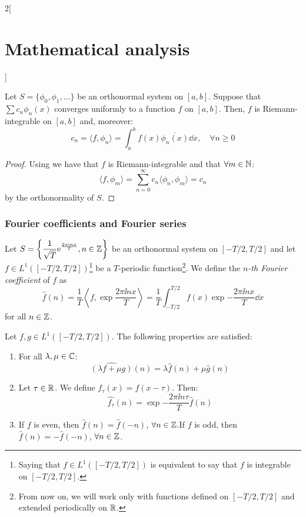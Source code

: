 \documentclass[../../../main_math.tex]{subfiles}
\begin{document}
\begin{multicols}{2}[\section{Mathematical analysis}]
\begin{definition}
  \end{definition}
  \begin{theorem}
    Let $S=\{\phi_0,\phi_1,\ldots\}$ be an orthonormal system on $[a,b]$. Suppose that $\sum c_n\phi_n(x)$ converges uniformly to a function $f$ on $[a,b]$. Then, $f$ is Riemann-integrable on $[a,b]$ and, moreover: $$c_n=\langle f,\phi_n\rangle=\int_a^bf(x)\overline{\phi_n(x)}\dd{x},\quad\forall n\geq 0$$
  \end{theorem}
  \begin{proof}
    Using  we have that $f$ is Riemann-integrable and that $\forall m\in\mathbb{N}$:
    $$\langle f,\phi_m\rangle=\sum_{n=0}^\infty c_n\langle \phi_n,\phi_m\rangle = c_n$$
    by the orthonormality of $S$.
  \end{proof}
  \subsubsection{Fourier coefficients and Fourier series}
  \begin{definition}
    Let $\displaystyle S=\left\{\frac{1}{\sqrt{T}}\mathrm{e}^{\frac{2\pi\mathrm{i} nx}{T}},n\in\mathbb{Z} \right\}$ be an orthonormal system on $[-T/2,T/2]$ and let $f\in L^1([-T/2,T/2])$\footnote{Saying that $f\in L^1([-T/2,T/2])$ is equivalent to say that $f$ is integrable on $[-T/2,T/2]$.} be a $T$-periodic function\footnote{From now on, we will work only with functions defined on $[-T/2,T/2]$ and extended periodically on $\mathbb{R} $.}. We define the \emph{$n$-th Fourier coefficient} of $f$ as $$\widehat{f}(n)=\frac{1}{T}\left\langle f,\exp{\frac{2\pi\ii nx}{T}}\right\rangle=\frac{1}{T}\int_{-T/2}^{T/2}f(x)\exp{-\frac{2\pi\ii nx}{T}}\dd{x}$$ for all $n\in\mathbb{Z} $.
  \end{definition}
  \begin{proposition}
    Let $f,g\in L^1([-T/2,T/2])$. The following properties are satisfied:
    \begin{enumerate}
      \item For all $\lambda,\mu\in\mathbb{C} $:
            $$\widehat{(\lambda f+\mu g)}(n)=\lambda\widehat{f}(n)+\mu\widehat{g}(n)$$
      \item\label{MA:fouriercoeffs2} Let $\tau\in\mathbb{R} $. We define $f_\tau(x)=f(x-\tau)$. Then: $$\widehat{f_\tau}(n)=\exp{-\frac{2\pi\ii n\tau}{T}}\widehat{f}(n)$$
      \item If $f$ is even, then $\widehat{f}(n)=\widehat{f}(-n)$, $\forall n\in\mathbb{Z} $.\newline If $f$ is odd, then $\widehat{f}(n)=-\widehat{f}(-n)$, $\forall n\in\mathbb{Z} $.

\end{enumerate}
\end{proposition}
\end{multicols}
\end{document}
